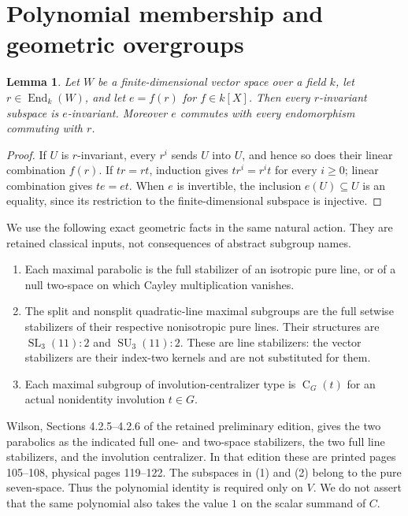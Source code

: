 \documentclass[11pt]{article}
\newtheorem{lemma}[theorem]{Lemma}
\newcommand{\CG}{\operatorname{C}}
\begin{document}
\section{Polynomial membership and geometric overgroups}

\begin{lemma}\label{poly}
Let $W$ be a finite-dimensional vector space over a field $k$, let
$r\in\operatorname{End}_k(W)$, and let $e=f(r)$ for $f\in k[X]$.
Then every $r$-invariant subspace is $e$-invariant. Moreover $e$ commutes
with every endomorphism commuting with $r$.
\end{lemma}
\begin{proof}
If $U$ is $r$-invariant, every $r^i$ sends $U$ into $U$, and hence so does
their linear combination $f(r)$. If $t r=r t$, induction gives
$t r^i=r^i t$ for every $i\geq0$; linear combination gives $te=et$.
When $e$ is invertible, the inclusion $e(U)\subseteq U$ is an equality,
since its restriction to the finite-dimensional subspace is injective.
\end{proof}

We use the following exact geometric facts in the same natural action.
They are retained classical inputs, not consequences of abstract subgroup
names.

\begin{enumerate}
\item Each maximal parabolic is the full stabilizer of an isotropic pure
line, or of a null two-space on which Cayley multiplication vanishes.
\item The split and nonsplit quadratic-line maximal subgroups are the
full setwise stabilizers of their respective nonisotropic pure lines.
Their structures are $\operatorname{SL}_3(11):2$ and
$\operatorname{SU}_3(11):2$. These are line stabilizers: the vector
stabilizers are their index-two kernels and are not substituted for them.
\item Each maximal subgroup of involution-centralizer type is
$\CG_G(t)$ for an actual nonidentity involution $t\in G$.
\end{enumerate}

Wilson, Sections 4.2.5--4.2.6 of the retained preliminary edition, gives
the two parabolics as the indicated full one- and two-space stabilizers,
the two full line stabilizers, and the involution centralizer. In that
edition these are printed pages 105--108, physical pages 119--122.
The subspaces in (1) and (2) belong to the pure seven-space. Thus the
polynomial identity is required only on $V$. We do not assert that the
same polynomial also takes the value $1$ on the scalar summand of $C$.
\end{document}
